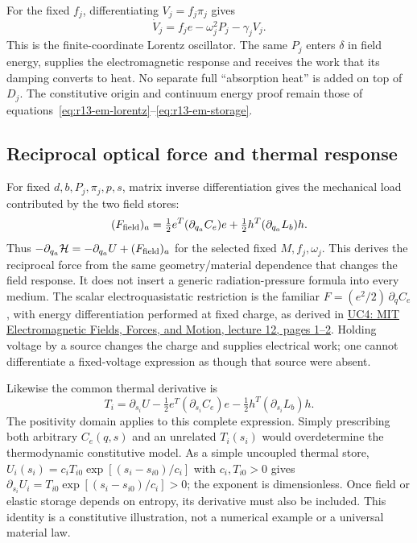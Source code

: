 For the fixed $f_j$, differentiating $V_j=f_j\pi_j$ gives
\begin{equation}
 \dot V_j=f_j e-\omega_j^2P_j-\gamma_jV_j.
 \label{eq:r14-finite-lorentz}
\end{equation}
This is the finite-coordinate Lorentz oscillator. The same $P_j$ enters
$\delta$ in field energy, supplies the electromagnetic response and receives
the work that its damping converts to heat. No separate full ``absorption
heat'' is added on top of $D_j$. The constitutive origin and continuum energy
proof remain those of equations~\eqref{eq:r13-em-lorentz}--\eqref{eq:r13-em-storage}.

\subsection{Reciprocal optical force and thermal response}
For fixed $d,b,P_j,\pi_j,p,s$, matrix inverse differentiation gives the
mechanical load contributed by the two field stores:
\begin{equation}
 (F_{\rm field})_a
  =\tfrac12 e^T(\partial_{q_a}C_e)e
   +\tfrac12 h^T(\partial_{q_a}L_b)h.
 \label{eq:r14-field-force}
\end{equation}
Thus $-\partial_{q_a}\mathcal H=-\partial_{q_a}U+(F_{\rm field})_a$
for the selected fixed $M,f_j,\omega_j$. This derives the reciprocal force
from the same geometry/material dependence that changes the field response.
It does not insert a generic radiation-pressure formula into every medium.
The scalar electroquasistatic restriction is the familiar
$F=(e^2/2)\,\partial_q C_e$, with energy differentiation performed at fixed
charge, as derived in
\href{https://ocw.mit.edu/courses/6-641-electromagnetic-fields-forces-and-motion-spring-2009/044362926d4b6bc9f849f4ece0c4c1f7_MIT6_641s09_lec12.pdf}
{UC4: MIT Electromagnetic Fields, Forces, and Motion, lecture 12, pages 1--2}.
Holding voltage by a source changes the charge and supplies electrical work;
one cannot differentiate a fixed-voltage expression as though that source
were absent.

Likewise the common thermal derivative is
\begin{equation}
 T_i=\partial_{s_i}U
       -\tfrac12 e^T(\partial_{s_i}C_e)e
       -\tfrac12 h^T(\partial_{s_i}L_b)h.
 \label{eq:r14-field-temperature}
\end{equation}
The positivity domain applies to this complete expression. Simply prescribing
both arbitrary $C_e(q,s)$ and an unrelated $T_i(s_i)$ would overdetermine the
thermodynamic constitutive model. As a simple uncoupled thermal store,
$U_i(s_i)=c_iT_{i0}\exp[(s_i-s_{i0})/c_i]$ with $c_i,T_{i0}>0$ gives
$\partial_{s_i}U_i=T_{i0}\exp[(s_i-s_{i0})/c_i]>0$; the exponent is
dimensionless. Once field or elastic storage depends on entropy, its derivative
must also be included. This identity is a constitutive illustration, not a
numerical example or a universal material law.

